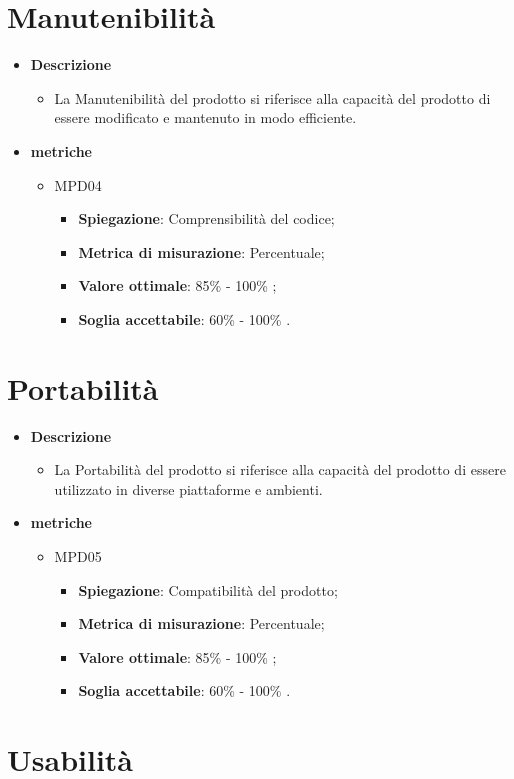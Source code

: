 \section{Manutenibilità}
\begin{itemize}
    \item \textbf{Descrizione}
    \begin{itemize}
        \item La Manutenibilità del prodotto si riferisce alla capacità del prodotto di essere modificato e mantenuto in modo efficiente.
    \end{itemize}
    
    \item \textbf{metriche}
    \begin{itemize}
        \item MPD04
        \begin{itemize}
            \item \textbf{Spiegazione}: Comprensibilità del codice;
        \item \textbf{Metrica di misurazione}: Percentuale;
        \item \textbf{Valore ottimale}: 85\% - 100\% ;
        \item \textbf{Soglia accettabile}: 60\% - 100\% .
        \end{itemize}
    \end{itemize}
    \end{itemize}


\section{Portabilità}
\begin{itemize}
    \item \textbf{Descrizione}
    \begin{itemize}
        \item La Portabilità del prodotto si riferisce alla capacità del prodotto di essere utilizzato in diverse piattaforme e ambienti.
    \end{itemize}
    
    \item \textbf{metriche}
    \begin{itemize}
        \item MPD05
        \begin{itemize}
            \item \textbf{Spiegazione}: Compatibilità del prodotto;
        \item \textbf{Metrica di misurazione}: Percentuale;
        \item \textbf{Valore ottimale}: 85\% - 100\% ;
        \item \textbf{Soglia accettabile}: 60\% - 100\% .
        \end{itemize}
    \end{itemize}
    \end{itemize}



\section{Usabilità}